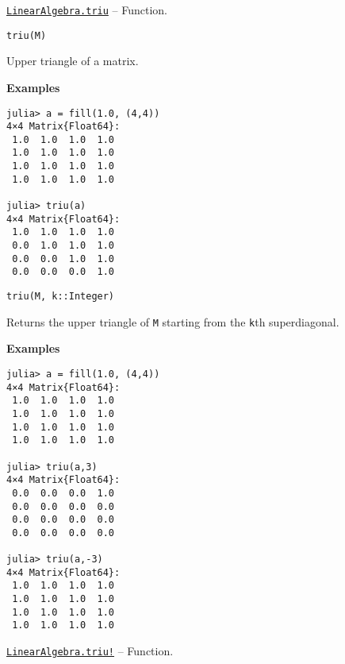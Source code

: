 \hypertarget{13861148483706203681}{}
\hyperlink{13861148483706203681}{\texttt{LinearAlgebra.triu}}  -- {Function.}

\begin{adjustwidth}{2em}{0pt}


\begin{verbatim}
triu(M)
\end{verbatim}

Upper triangle of a matrix.

\textbf{Examples}


\begin{verbatim}
julia> a = fill(1.0, (4,4))
4×4 Matrix{Float64}:
 1.0  1.0  1.0  1.0
 1.0  1.0  1.0  1.0
 1.0  1.0  1.0  1.0
 1.0  1.0  1.0  1.0

julia> triu(a)
4×4 Matrix{Float64}:
 1.0  1.0  1.0  1.0
 0.0  1.0  1.0  1.0
 0.0  0.0  1.0  1.0
 0.0  0.0  0.0  1.0
\end{verbatim}




\begin{lstlisting}
triu(M, k::Integer)
\end{lstlisting}

Returns the upper triangle of \texttt{M} starting from the \texttt{k}th superdiagonal.

\textbf{Examples}


\begin{verbatim}
julia> a = fill(1.0, (4,4))
4×4 Matrix{Float64}:
 1.0  1.0  1.0  1.0
 1.0  1.0  1.0  1.0
 1.0  1.0  1.0  1.0
 1.0  1.0  1.0  1.0

julia> triu(a,3)
4×4 Matrix{Float64}:
 0.0  0.0  0.0  1.0
 0.0  0.0  0.0  0.0
 0.0  0.0  0.0  0.0
 0.0  0.0  0.0  0.0

julia> triu(a,-3)
4×4 Matrix{Float64}:
 1.0  1.0  1.0  1.0
 1.0  1.0  1.0  1.0
 1.0  1.0  1.0  1.0
 1.0  1.0  1.0  1.0
\end{verbatim}



\end{adjustwidth}
\hypertarget{17824694935904725032}{}
\hyperlink{17824694935904725032}{\texttt{LinearAlgebra.triu!}}  -- {Function.}

